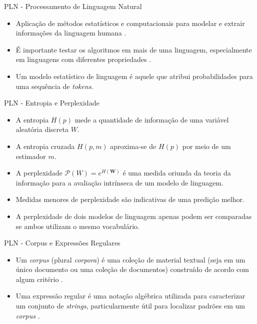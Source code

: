 \documentclass{beamer}
\newcommand{\Perp}{\mathcal{P}}
\newcommand{\bs}[1]{\boldsymbol{#1}}
\begin{document}
    \begin{frame}{PLN - Processamento de Linguagem Natural}
        \begin{itemize}
            \justifying
            \item Aplicação de métodos estatísticos e computacionais para modelar e extrair informações da linguagem humana \citep{kamath2019}.
            \item É importante testar os algoritmos em mais de uma linguagem, especialmente em linguagens com diferentes propriedades \citep{jurafsky2021}.
            \item Um modelo estatístico de linguagem é aquele que atribui probabilidades para uma sequência de \textit{tokens}. 
        \end{itemize}
    \end{frame}

    \begin{frame}{PLN - Entropia e Perplexidade}
        \begin{itemize}
            \justifying
            \item A entropia $H(p)$ mede a quantidade de informação de uma variável aleatória discreta $W$.
            \item A entropia cruzada $H(p,m)$ aproxima-se de $H(p)$ por meio de um estimador $m$.
            \item A perplexidade $\Perp(W)=e^{H(\bs{W})}$ é uma medida oriunda da teoria da informação para a avaliação intrínseca de um modelo de linguagem.
            \item Medidas menores de perplexidade são indicativas de uma predição melhor.
            \item A perplexidade de dois modelos de linguagem apenas podem ser comparadas se ambos utilizam o mesmo vocabulário.
        \end{itemize}
    \end{frame}

    \begin{frame}{PLN - Corpus e Expressões Regulares}
        \begin{itemize}
            \justifying
            \item Um \textit{corpus} (plural \textit{corpora}) é uma coleção de material textual (seja em um único documento ou uma coleção de documentos) construído de acordo com algum critério \citep{manning1999, kamath2019}.
            \item Uma expressão regular é uma notação algébrica utilizada para caracterizar um conjunto de \textit{strings}, particularmente útil para localizar padrões em um \textit{corpus} \citep{jurafsky2021}.
        \end{itemize}
    \end{frame}
\end{document}
